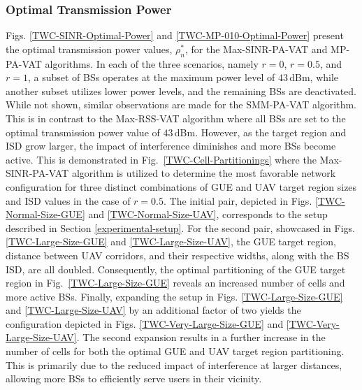 \subsubsection{Optimal Transmission Power}
Figs. \ref{TWC-SINR-Optimal-Power} and \ref{TWC-MP-010-Optimal-Power} present the optimal transmission power values,  $\rho_n^*$, for the Max-SINR-PA-VAT and MP-PA-VAT algorithms. In each of the three scenarios, namely $r=0$, $r=0.5$, and $r=1$, a subset of BSs operates at the maximum power level of $43$\,dBm, while another subset utilizes lower power levels, and the remaining BSs are deactivated. While not shown, similar observations are made for the SMM-PA-VAT algorithm. This is in contrast to the Max-RSS-VAT algorithm where all BSs are set to the optimal transmission power value of $43$\,dBm. %
However, as the target region and ISD grow larger, the impact of interference diminishes and more BSs become active. This is demonstrated in Fig.~\ref{TWC-Cell-Partitionings} where the Max-SINR-PA-VAT algorithm is utilized to determine the most favorable network configuration for three distinct combinations of GUE and UAV target region sizes and ISD values in the case of $r = 0.5$. 
The initial pair, depicted in Figs. \ref{TWC-Normal-Size-GUE} and \ref{TWC-Normal-Size-UAV}, corresponds to the setup described in Section \ref{experimental-setup}. For the second pair, showcased in Figs. \ref{TWC-Large-Size-GUE} and \ref{TWC-Large-Size-UAV}, the GUE target region, distance between UAV corridors, and their respective widths, along with the BS ISD, are all doubled. Consequently, the optimal partitioning of the GUE target region in Fig.~\ref{TWC-Large-Size-GUE} reveals an increased number of cells and more active BSs. Finally, expanding the setup in Figs. \ref{TWC-Large-Size-GUE} and \ref{TWC-Large-Size-UAV} by an additional factor of two yields the configuration depicted in Figs. \ref{TWC-Very-Large-Size-GUE} and \ref{TWC-Very-Large-Size-UAV}. The second expansion results in a further increase in the number of cells for both the optimal GUE and UAV target region partitioning. This is primarily due to the reduced impact of interference at larger distances, allowing more BSs to efficiently serve users in their vicinity.


